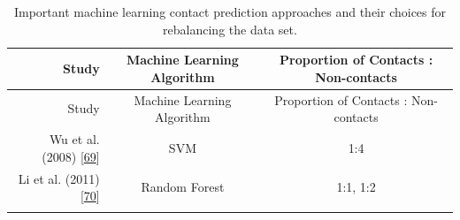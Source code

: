 \documentclass[11pt,a4paper,twoside]{book}
\theoremstyle{definition}
\theoremstyle{definition}
\theoremstyle{remark}
\begin{document}
\begin{longtable}[]{@{}rcc@{}}
\caption{\label{tab:rebalancing-dataset} Important machine learning contact
prediction approaches and their choices for rebalancing the data
set.}\tabularnewline
\toprule
\begin{minipage}[b]{0.32\columnwidth}\raggedleft\strut
Study\strut
\end{minipage} & \begin{minipage}[b]{0.19\columnwidth}\centering\strut
Machine Learning Algorithm\strut
\end{minipage} & \begin{minipage}[b]{0.29\columnwidth}\centering\strut
Proportion of Contacts : Non-contacts\strut
\end{minipage}\tabularnewline
\midrule
\endfirsthead
\toprule
\begin{minipage}[b]{0.32\columnwidth}\raggedleft\strut
Study\strut
\end{minipage} & \begin{minipage}[b]{0.19\columnwidth}\centering\strut
Machine Learning Algorithm\strut
\end{minipage} & \begin{minipage}[b]{0.29\columnwidth}\centering\strut
Proportion of Contacts : Non-contacts\strut
\end{minipage}\tabularnewline
\midrule
\endhead
\begin{minipage}[t]{0.32\columnwidth}\raggedleft\strut
Wu et al. (2008) {[}\protect\hyperlink{ref-Wu2008}{69}{]}\strut
\end{minipage} & \begin{minipage}[t]{0.19\columnwidth}\centering\strut
SVM\strut
\end{minipage} & \begin{minipage}[t]{0.29\columnwidth}\centering\strut
1:4\strut
\end{minipage}\tabularnewline
\begin{minipage}[t]{0.32\columnwidth}\raggedleft\strut
Li et al. (2011) {[}\protect\hyperlink{ref-Li2011}{70}{]}\strut
\end{minipage} & \begin{minipage}[t]{0.19\columnwidth}\centering\strut
Random Forest\strut
\end{minipage} & \begin{minipage}[t]{0.29\columnwidth}\centering\strut
1:1, 1:2\strut
\end{minipage}\tabularnewline
\begin{minipage}[t]{0.32\columnwidth}\raggedleft\strut

\end{minipage}
\end{longtable}
\end{document}
